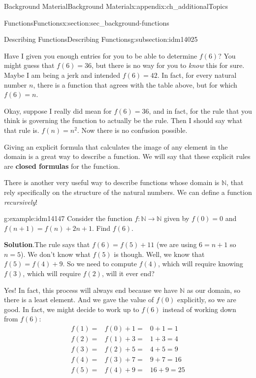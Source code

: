 \documentclass[oneside,10pt,]{book}
\newcommand{\terminology}[1]{\textbf{#1}}
\numberwithin{equation}{chapter}
\def\N{\mathbb N}
\newcommand{\amp}{&}
\begin{document}
\begin{appendixptx}{Background Material}{}{Background Material}{}{}{x:appendix:ch_additionalTopics}
\begin{sectionptx}{Functions}{}{Functions}{}{}{x:section:sec_background-functions}
\begin{subsectionptx}{Describing Functions}{}{Describing Functions}{}{}{g:subsection:idm14025}
\begin{sidebyside}{1}{0}{0}{0}
\end{sidebyside}%
\par
Have I given you enough entries for you to be able to determine \(f(6)\)?  You might guess that \(f(6) = 36\), but there is no way for you to \emph{know} this for sure.  Maybe I am being a jerk and intended \(f(6) = 42\).  In fact, for every natural number \(n\), there is a function that agrees with the table above, but for which \(f(6) = n\).%
\par
Okay, suppose I really did mean for \(f(6) = 36\), and in fact, for the rule that you think is governing the function to actually be the rule.  Then I should say what that rule is.  \(f(n) = n^2\).  Now there is no confusion possible.%
\par
{} Giving an explicit formula that calculates the image of any element in the domain is a great way to describe a function.  We will say that these explicit rules are \terminology{closed formulas} for the function.%
\par
There is another very useful way to describe functions whose domain is \(\N\), that rely specifically on the structure of the natural numbers.  We can define a function \emph{recursively}!%
\begin{example}{}{g:example:idm14147}%
Consider the function \(f:\N \to \N\) given by \(f(0) = 0\) and \(f(n+1) = f(n) + 2n+1\).  Find \(f(6)\).%
\par\smallskip%
\noindent\textbf{Solution}.\hypertarget{g:solution:idm14154}{}\quad{}The rule says that \(f(6) = f(5) + 11\) (we are using \(6 = n+1\) so \(n = 5\)).  We don't know what \(f(5)\) is though.  Well, we know that \(f(5) = f(4) + 9\).  So we need to compute \(f(4)\), which will require knowing \(f(3)\), which will require \(f(2)\),\textellipsis{} will it ever end?%
\par
Yes!  In fact, this process will always end because we have \(\N\) as our domain, so there is a least element.  And we gave the value of \(f(0)\) explicitly, so we are good.  In fact, we might decide to work up to \(f(6)\) instead of working down from \(f(6)\):%
\begin{align*}
f(1) = \amp f(0) + 1 = \amp 0 + 1 = 1\\
f(2) = \amp f(1) + 3 = \amp 1 + 3 = 4\\
f(3) = \amp f(2) + 5 = \amp 4 + 5 = 9\\
f(4) = \amp f(3) + 7 = \amp 9 + 7 = 16\\
f(5) = \amp f(4) + 9 = \amp 16 + 9 = 25\\

\end{align*}
\end{example}
\end{subsectionptx}
\end{sectionptx}
\end{appendixptx}
\end{document}
